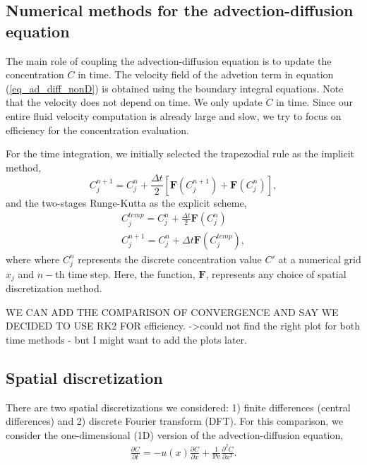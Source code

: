 \subsection{Numerical methods for the advection-diffusion equation}
The main role of coupling the advection-diffusion equation is to update the concentration $C$ in time. The velocity field of the advetion term in equation (\ref{eq_ad_diff_nonD}) is obtained using the boundary integral equations. Note that the velocity does not depend on time. 
We only update $C$ in time. Since our entire fluid velocity computation is already large and slow, we try to focus on efficiency for the concentration evaluation.
\par
For the time integration, 
we initially selected the trapezodial rule as the implicit method,
\begin{equation}
	C_{j}^{n+1}
	 = C_{j}^{n}+ \frac{\Delta t}{2 } \left[  {\bm F} \left(C_j^{n+1} \right)+ {\bm F}\left(C_j^{n} \right) \right],
	 \label{eq_trap}
\end{equation}
and the two-stages Runge-Kutta as the explicit scheme,
\begin{align}
	C_{j}^{temp} = C_j^{n} + \frac{\Delta t}{2} {\bm F} \left( C_j^{n} \right)
	\\ 
	C_j^{n+1} = C_j^{n} + \Delta t {\bm F} \left( C_j^{temp} \right),
\end{align}
where where $C_j^n$  represents the discrete concentration value $C'$ at a numerical grid $x_j$ and $n-$th time step.
Here, the function, $\bm{F}$, represents any choice of spatial discretization method. 

{\color{blue}WE CAN ADD THE COMPARISON OF CONVERGENCE AND SAY WE DECIDED TO USE RK2 FOR efficiency. ->could not find the right plot for both time methods - but I might want to add the plots later.}
\subsection{Spatial discretization}
There are two spatial discretizations we considered: 1) finite differences (central differences) and 2) discrete Fourier transform (DFT). 
For this comparison, we consider the one-dimensional (1D) version of the advection-diffusion equation,
\begin{align}
	\frac{\partial C}{\partial t} = 
	- u(x) \frac{\partial C}{\partial x} 
	+ \frac{1}{\text{Pe}} \frac{\partial^2 C}{\partial x^2}.
	\label{eq_space_C}
\end{align}

